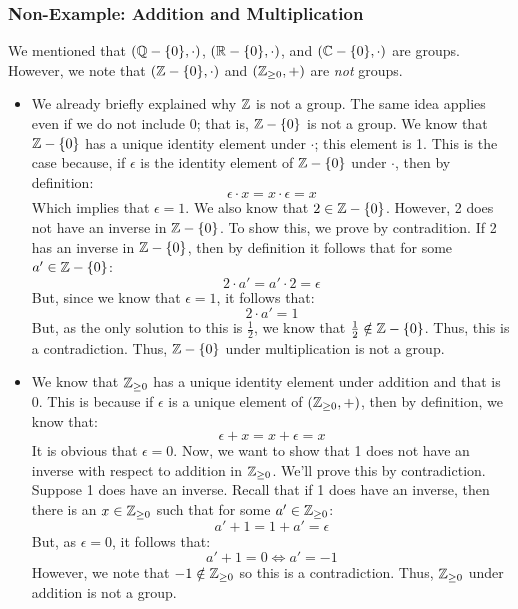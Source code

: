 \documentclass[letterpaper]{article}
\begin{document}
\subsubsection{Non-Example: Addition and Multiplication}
We mentioned that $(\mathbb{Q} - \{0\}, \cdot)$, $(\mathbb{R} - \{0\}, \cdot)$, and $(\mathbb{C} - \{0\}, \cdot)$ are groups. However, we note that $(\mathbb{Z} - \{0\}, \cdot)$ and $(\mathbb{Z}_{\geq 0}, +)$ are \emph{not} groups. 
\begin{itemize}
    \item We already briefly explained why $\mathbb{Z}$ is not a group. The same idea applies even if we do not include 0; that is, $\mathbb{Z} - \{0\}$ is not a group. We know that $\mathbb{Z} - \{0\}$ has a unique identity element under $\cdot$; this element is 1. This is the case because, if $\epsilon$ is the identity element of $\mathbb{Z} - \{0\}$ under $\cdot$, then by definition: 
    \[\epsilon \cdot x = x \cdot \epsilon = x\]
    Which implies that $\epsilon = 1$. We also know that $2 \in \mathbb{Z} - \{0\}$. However, 2 does not have an inverse in $\mathbb{Z} - \{0\}$. To show this, we prove by contradition. If 2 has an inverse in $\mathbb{Z} - \{0\}$, then by definition it follows that for some $a' \in \mathbb{Z} - \{0\}$:
    \[2 \cdot a' = a' \cdot 2 = \epsilon\]
    But, since we know that $\epsilon = 1$, it follows that:
    \[2 \cdot a'= 1\]
    But, as the only solution to this is $\frac{1}{2}$, we know that $\frac{1}{2} \notin \mathbb{Z} - \{0\}$. Thus, this is a contradiction. Thus, $\mathbb{Z} - \{0\}$ under multiplication is not a group. 

    \item We know that $\mathbb{Z}_{\geq 0}$ has a unique identity element under addition and that is 0. This is because if $\epsilon$ is a unique element of $(\mathbb{Z}_{\geq 0}, +)$, then by definition, we know that: 
    \[\epsilon + x = x + \epsilon = x\]
    It is obvious that $\epsilon = 0$. Now, we want to show that 1 does not have an inverse with respect to addition in $\mathbb{Z}_{\geq 0}$. We'll prove this by contradiction. Suppose 1 does have an inverse. Recall that if 1 does have an inverse, then there is an $x \in \mathbb{Z}_{\geq 0}$ such that for some $a' \in \mathbb{Z}_{\geq 0}$:
    \[a' + 1 = 1 + a' = \epsilon\]
    But, as $\epsilon = 0$, it follows that: 
    \[a' + 1 = 0 \iff a' = -1\]
    However, we note that $-1 \notin \mathbb{Z}_{\geq 0}$ so this is a contradiction. Thus, $\mathbb{Z}_{\geq 0}$ under addition is not a group.
\end{itemize}
\end{document}
